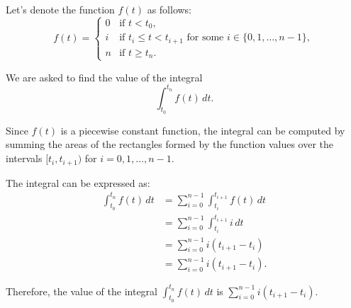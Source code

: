 Let's denote the function $f(t)$ as follows:
$$f(t) = \begin{cases} 0 & \text{if } t < t_0, \\ i & \text{if } t_i \leq t < t_{i+1} \text{ for some } i \in \{0,1,\ldots,n-1\}, \\ n & \text{if } t \geq t_n. \end{cases}$$

We are asked to find the value of the integral
$$\int_{t_0}^{t_n} f(t) \, dt.$$

Since $f(t)$ is a piecewise constant function, the integral can be computed by summing the areas of the rectangles formed by the function values over the intervals $[t_i, t_{i+1})$ for $i = 0, 1, \ldots, n-1$.

The integral can be expressed as:
\begin{align*}
\int_{t_0}^{t_n} f(t) \, dt &= \sum_{i=0}^{n-1} \int_{t_i}^{t_{i+1}} f(t) \, dt \\
&= \sum_{i=0}^{n-1} \int_{t_i}^{t_{i+1}} i \, dt \\
&= \sum_{i=0}^{n-1} i(t_{i+1} - t_i) \\
&= \sum_{i=0}^{n-1} i(t_{i+1} - t_i).
\end{align*}

Therefore, the value of the integral $\int_{t_0}^{t_n} f(t) \, dt$ is $\sum_{i=0}^{n-1} i(t_{i+1} - t_i)$.
